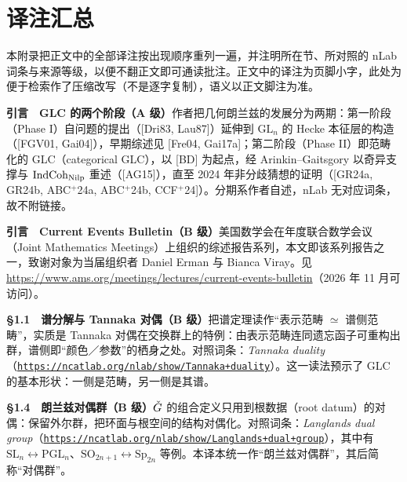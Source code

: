 \clearpage
\section*{译注汇总}

本附录把正文中的全部译注按出现顺序重列一遍，并注明所在节、所对照的 nLab 词条与来源等级，以便不翻正文即可通读批注。正文中的译注为页脚小字，此处为便于检索作了压缩改写（不是逐字复制），语义以正文脚注为准。

\medskip
\noindent\textbf{引言　GLC 的两个阶段（A 级）}\quad 作者把几何朗兰兹的发展分为两期：第一阶段（Phase I）自问题的提出（[Dri83, Lau87]）延伸到 $\mathrm{GL}_{n}$ 的 Hecke 本征层的构造（[FGV01, Gai04]），早期综述见 [Fre04, Gai17a]；第二阶段（Phase II）即范畴化的 GLC（categorical GLC），以 [BD] 为起点，经 Arinkin--Gaitsgory 以奇异支撑与 $\operatorname{IndCoh}_{\operatorname{Nilp}}$ 重述（[AG15]），直至 2024 年非分歧猜想的证明（[GR24a, GR24b, ABC${}^{+}$24a, ABC${}^{+}$24b, CCF${}^{+}$24]）。分期系作者自述，nLab 无对应词条，故不附链接。

\smallskip
\noindent\textbf{引言　Current Events Bulletin（B 级）}\quad 美国数学会在年度联合数学会议（Joint Mathematics Meetings）上组织的综述报告系列，本文即该系列报告之一，致谢对象为当届组织者 Daniel Erman 与 Bianca Viray。见 \url{https://www.ams.org/meetings/lectures/current-events-bulletin}（2026 年 11 月可访问）。

\smallskip
\noindent\textbf{§1.1　谱分解与 Tannaka 对偶（B 级）}\quad 把谱定理读作“表示范畴 $\simeq$ 谱侧范畴”，实质是 Tannaka 对偶在交换群上的特例：由表示范畴连同遗忘函子可重构出群，谱侧即“颜色／参数”的栖身之处。对照词条：\emph{Tannaka duality}（\href{https://ncatlab.org/nlab/show/Tannaka+duality}{\texttt{https:/\allowbreak{}/\allowbreak{}ncatlab.\allowbreak{}org/\allowbreak{}nlab/\allowbreak{}show/\allowbreak{}Tannaka+\allowbreak{}duality}}）。这一读法预示了 GLC 的基本形状：一侧是范畴，另一侧是其谱。

\smallskip
\noindent\textbf{§1.4　朗兰兹对偶群（B 级）}\quad $\check{G}$ 的组合定义只用到根数据（root datum）的对偶：保留外尔群，把环面与根空间的结构对偶化。对照词条：\emph{Langlands dual group}（\href{https://ncatlab.org/nlab/show/Langlands+dual+group}{\texttt{https:/\allowbreak{}/\allowbreak{}ncatlab.\allowbreak{}org/\allowbreak{}nlab/\allowbreak{}show/\allowbreak{}Langlands+\allowbreak{}dual+\allowbreak{}group}}），其中有 $\mathrm{SL}_{n}\leftrightarrow\mathrm{PGL}_{n}$、$\mathrm{SO}_{2n+1}\leftrightarrow\mathrm{Sp}_{2n}$ 等例。本译本统一作“朗兰兹对偶群”，其后简称“对偶群”。

